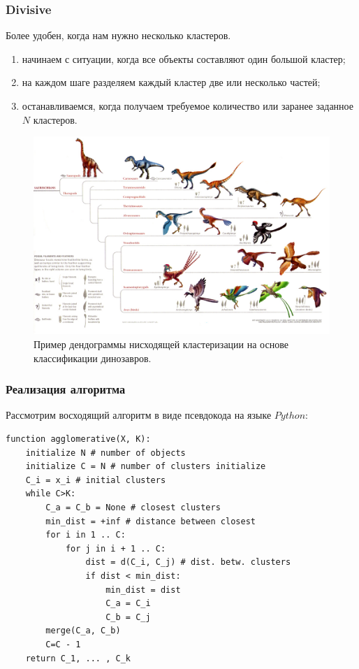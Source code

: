 \subsubsection{Divisive}
Более удобен, когда нам нужно несколько кластеров.
\begin{enumerate}
\item начинаем с ситуации, когда все объекты составляют один большой кластер;
\item на каждом шаге разделяем каждый кластер две или несколько частей;
\item останавливаемся, когда получаем требуемое количество или заранее заданное $N$ кластеров.
\end{enumerate}

\begin{figure}[H]
\centering
    \includegraphics[width=150mm]{images/dino.jpg}
    \caption{Пример дендограммы нисходящей кластеризации на основе классификации динозавров.}
    \label{dino}
\end{figure}


\subsubsection{Реализация алгоритма}
Рассмотрим восходящий алгоритм в виде псевдокода на языке $Python$:
\begin{lstlisting}
function agglomerative(X, K):
    initialize N # number of objects 
    initialize C = N # number of clusters initialize 
    C_i = x_i # initial clusters 
    while C>K:
        C_a = C_b = None # closest clusters 
        min_dist = +inf # distance between closest 
        for i in 1 .. C:
            for j in i + 1 .. C:
                dist = d(C_i, C_j) # dist. betw. clusters 
                if dist < min_dist:
                    min_dist = dist 
                    C_a = C_i 
                    C_b = C_j
        merge(C_a, C_b)
        C=C - 1
    return C_1, ... , C_k
\end{lstlisting}


